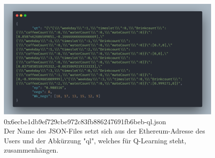 \begin{figure}[th!]
	\centering
	\includegraphics[width=.9\columnwidth]{./Abbildungen/Kapitel_03/usr_json.png}
	\caption{
		0x6ecbe1db9ef729cbe972c83fb886247691fb6beb-ql.json\\
		Der Name des JSON-Files setzt sich aus der Ethereum-Adresse des Users und der Abkürzung "ql", welches für Q-Learning steht, zusammenhängen.
	}
	\label{img:abb2}
\end{figure}

